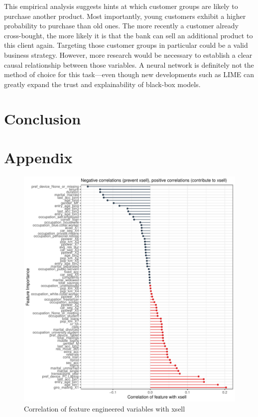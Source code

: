 \documentclass[12pt,a4paper]{article}
\begin{document}
This empirical analysis suggests hints at which customer groups are likely to purchase another product.
Most importantly, young customers exhibit a higher probability to purchase than old ones. The more recently a customer already cross-bought,
the more likely it is that the bank can sell an additional product to this client again.
Targeting those customer groups in particular could be a valid business strategy.
However, more research would be necessary to establish a clear causal relationship between those variables.
A neural network is definitely not the method of choice for this task---even though new developments such as LIME can greatly expand the trust and explainability of black-box models.

\section{Conclusion}




\clearpage
\appendix
\section{Appendix}
\begin{figure}[ht]
	\centering
  \includegraphics[scale=0.8]{figures/corrplot.pdf}
	\caption{Correlation of feature engineered variables with xsell}
	\label{fig_corr}
\end{figure}
\end{document}
